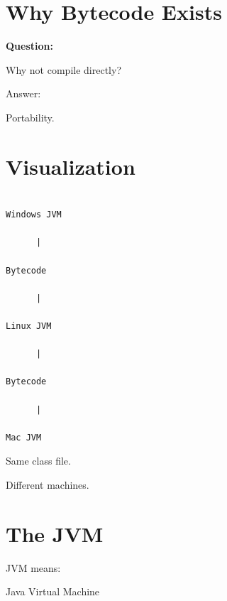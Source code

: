 \documentclass[11pt,a4paper]{book}
\begin{document}
\section{Why Bytecode Exists}

\textbf{Question:}


Why not compile directly?


Answer:


Portability.


\section{Visualization}

\begin{verbatim}

Windows JVM

      |

Bytecode

      |

Linux JVM

      |

Bytecode

      |

Mac JVM

\end{verbatim}


Same class file.


Different machines.


\section{The JVM}

JVM means:


Java Virtual Machine

\end{document}

